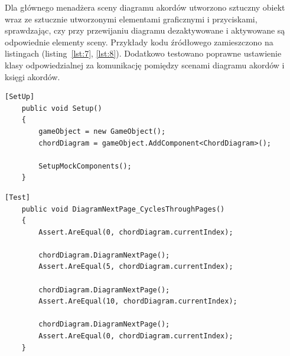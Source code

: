 Dla głównego menadżera sceny diagramu akordów utworzono sztuczny obiekt wraz ze sztucznie utworzonymi elementami graficznymi i przyciskami, sprawdzając, czy przy przewijaniu diagramu dezaktywowane i aktywowane są odpowiednie elementy sceny. Przykłady kodu źródłowego zamieszczono na listingach (listing~\ref{lst:7}, \ref{lst:8}). Dodatkowo testowano poprawne ustawienie klasy odpowiedzialnej za komunikację pomiędzy scenami diagramu akordów i księgi akordów.

\begin{lstlisting}[style=sharpcstyle,caption=Funkcja \texttt{Setup}, label=lst:7]
    [SetUp]
    public void Setup()
    {
        gameObject = new GameObject();
        chordDiagram = gameObject.AddComponent<ChordDiagram>();

        SetupMockComponents();
    }
\end{lstlisting}

\begin{lstlisting}[style=sharpcstyle,caption=Funkcja \texttt{DiagramNextPage\_CyclesThroughPages}, label=lst:8]
    [Test]
    public void DiagramNextPage_CyclesThroughPages()
    {
        Assert.AreEqual(0, chordDiagram.currentIndex);

        chordDiagram.DiagramNextPage();
        Assert.AreEqual(5, chordDiagram.currentIndex);

        chordDiagram.DiagramNextPage();
        Assert.AreEqual(10, chordDiagram.currentIndex);

        chordDiagram.DiagramNextPage();
        Assert.AreEqual(0, chordDiagram.currentIndex);
    }
\end{lstlisting}